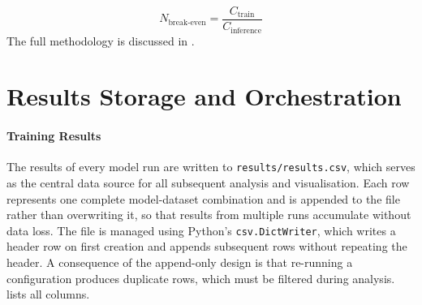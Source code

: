 \begin{equation}
  \label{eq:N_Breakeven}
  N_{\text{break-even}} = \frac{C_{\text{train}}}{C_{\text{inference}}}
\end{equation}
The full methodology is discussed in .

\section{Results Storage and Orchestration}
\label{implementation_results}

\paragraph{Training Results}
The results of every model run are written to \texttt{results/results.csv}, which serves as the central data source for all subsequent analysis and visualisation. Each row represents one complete model-dataset combination and is appended to the file rather than overwriting it, so that results from multiple runs accumulate without data loss. The file is managed using Python's \texttt{csv.DictWriter}, which writes a header row on first creation and appends subsequent rows without repeating the header. A consequence of the append-only design is that re-running a configuration produces duplicate rows, which must be filtered during analysis.  lists all columns.

